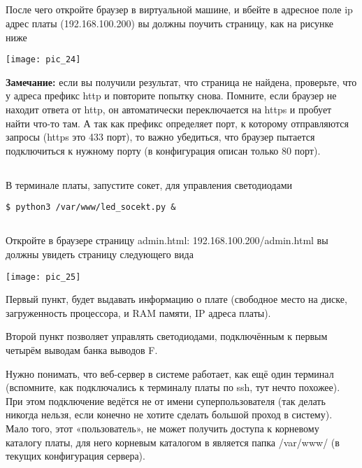 \subsection{}После чего откройте браузер в виртуальной машине, и вбейте в адресное поле ip адрес платы (192.168.100.200) вы должны поучить страницу, как на рисунке ниже
\begin{center}
	\texttt{[image: pic\_24]}
\end{center}
\textbf{Замечание:} если вы получили результат, что страница не найдена, проверьте, что у адреса префикс http и повторите попытку снова. Помните, если браузер не находит ответа от http, он автоматически переключается на https и пробует найти что-то там. А так как префикс определяет порт, к которому отправляются запросы (https это 433 порт), то важно убедиться, что браузер пытается подключиться к нужному порту (в конфигурация описан только 80 порт).

\subsection{}В терминале платы, запустите сокет, для управления светодиодами 
\begin{lstlisting}[style=bash]
$ python3 /var/www/led_socekt.py &
\end{lstlisting}

\subsection{}Откройте в браузере страницу admin.html: 192.168.100.200/admin.html
вы должны увидеть страницу следующего вида
\begin{center}
	\texttt{[image: pic\_25]}
\end{center}

Первый пункт, будет выдавать информацию о плате (свободное место на диске, загруженность процессора, и RAM памяти, IP адреса платы).

Второй пункт позволяет управлять светодиодами, подключённым к первым четырём выводам банка выводов F.

Нужно понимать, что веб-сервер в системе работает, как ещё один терминал (вспомните, как подключались к терминалу платы по ssh, тут нечто похожее). При этом подключение ведётся не от имени суперпользователя (так делать никогда нельзя, если конечно не хотите сделать большой проход в систему). Мало того, этот «пользователь», не может получить доступа к корневому каталогу платы, для него корневым каталогом в является папка /var/www/ (в текущих конфигурация сервера).

